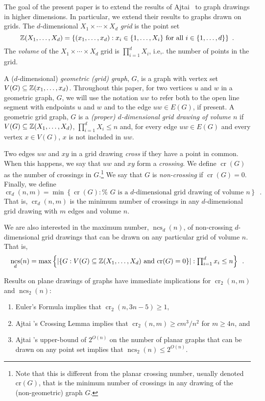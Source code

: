 \documentclass{patmorin}
\DeclareMathOperator{\crs}{cr}
\DeclareMathOperator{\ncs}{ncs}
\begin{document}
The goal of the present paper is to extend the results of Ajtai
\etal\ to graph drawings in higher dimensions.  In particular, we
extend their results to graphs drawn on grids.  The $d$-dimensional
\emph{$X_1\times\cdots\times X_d$ grid} is the point set
\[  \mathbb{Z}(X_1,\ldots,X_d) = \{(x_1,\ldots,x_d): 
      \mbox{$x_i\in\{1,\ldots,X_i\}$ for all $i\in\{1,\ldots,d\}$}\}
	\enspace .\]
The \emph{volume} of the $X_1\times\cdots\times X_d$ grid is
$\prod_{i=1}^d X_i$, i.e,. the number of points in the grid.

A ($d$-dimensional) \emph{geometric (grid) graph}, $G$, is a graph with
vertex set $V(G)\subseteq \mathbb{Z}(x_1,\ldots,x_d)$.  Throughout this paper,
for two vertices $u$ and $w$ in a geometric graph, $G$, we will use the
notation $uw$ to refer both to the open line segment with endpoints $u$
and $w$ and to the edge $uw\in E(G)$, if present.
A geometric grid graph, $G$ is a \emph{(proper) $d$-dimensional grid drawing
of volume $n$} if $V(G)\subseteq \mathbb{Z}(X_1,\ldots,X_d)$, $\prod_{i=1}^d X_i \le n$ and, for every edge $uw\in E(G)$ and every vertex $x\in V(G)$, $x$ is not included in $uw$.

Two edges $uw$ and $xy$ in a grid drawing \emph{cross} if they have a
point in common.  When this happens, we say that $uw$ and $xy$ form
a \emph{crossing}.  We define $\crs(G)$ as the number of crossings
in $G$.\footnote{Note that this is different from the planar crossing
number, usually denoted $\mathrm{cr}(G)$, that is the minimum number of
crossings in any drawing of the (non-geometric) graph $G$.}  We say that
$G$ is \emph{non-crossing} if $\crs(G)=0$.  Finally, we define
\[ \crs_d(n,m)=\min\left\{\crs(G):\mbox{%
    $G$ is a $d$-dimensional grid drawing of volume $n$}
   \right\} \enspace .
\]
That is, $\crs_d(n,m)$ is the minimum number of crossings in any
$d$-dimensional grid drawing with $m$ edges and volume $n$.

We are also interested in the maximum number, $\ncs_d(n)$, of non-crossing
$d$-dimensional grid drawings that can be drawn on any particular grid
of volume $n$.  That is,
\[
  \ncs_d(n) = \max\left\{
     \left|\left\{G:\mbox{$V(G)\subseteq\Z(X_1,\ldots,X_d)$
            and $\crs(G)=0$} \right\}\right| :
    \mbox{$\prod_{i=1}^d x_i \le n$} \right\} \enspace .
\]

Results on plane drawings of graphs have immediate implications
for $\crs_2(n,m)$ and $\ncs_2(n)$:
\begin{enumerate}
  \item  Euler's Formula implies that $\crs_2(n,3n-5)\ge 1$,
  \item  Ajtai \etal's Crossing Lemma implies that $\crs_2(n,m)\ge
  cm^3/n^2$ for $m\ge 4n$, and
  \item  Ajtai \etal's upper-bound of $2^{O(n)}$ on the number of planar
  graphs that can be drawn on any point set implies that $\ncs_2(n)\le
  2^{O(n)}$.
\end{enumerate}
\end{document}
